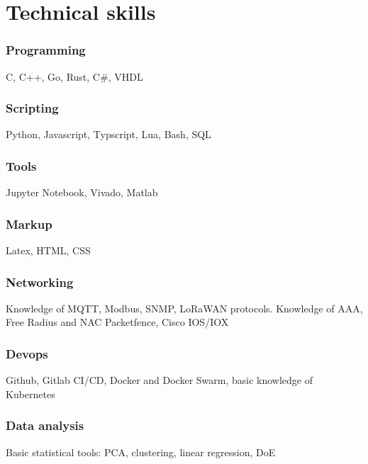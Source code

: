 \documentclass[11pt,a4paper]{article}
\begin{document}
\section{Technical skills}
\subsubsection{Programming}
C, C++, Go, Rust, C\#, VHDL

\subsubsection{Scripting}
Python, Javascript, Typscript, Lua, Bash, SQL

\subsubsection{Tools}
Jupyter Notebook, Vivado, Matlab

\subsubsection{Markup}
Latex, HTML, CSS

\subsubsection{Networking}
Knowledge of MQTT, Modbus, SNMP, LoRaWAN protocols. Knowledge of AAA, Free Radius and NAC Packetfence, Cisco IOS/IOX

\subsubsection{Devops}
Github, Gitlab CI/CD, Docker and Docker Swarm, basic knowledge of Kubernetes

\subsubsection{Data analysis}
Basic statistical tools: PCA, clustering, linear regression, DoE
\end{document}
